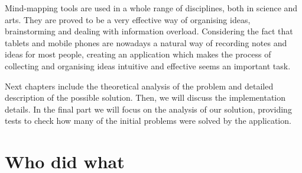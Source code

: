 
Mind-mapping tools are used in a whole range of disciplines, both in science and arts. They are proved to be a very effective way of organising ideas, brainstorming and dealing with information overload. Considering the fact that tablets and mobile phones are nowadays a natural way of recording notes and ideas for most people, creating an application which makes the process of collecting and organising ideas intuitive and effective seems an important task.


Next chapters include the theoretical analysis of the problem and detailed description of the possible solution. Then, we will discuss the implementation details. In the final part we will focus on the analysis of our solution, providing tests to check how many of the initial problems were solved by the application.

\section{Who did what}
\label{sec:who-did-what}

